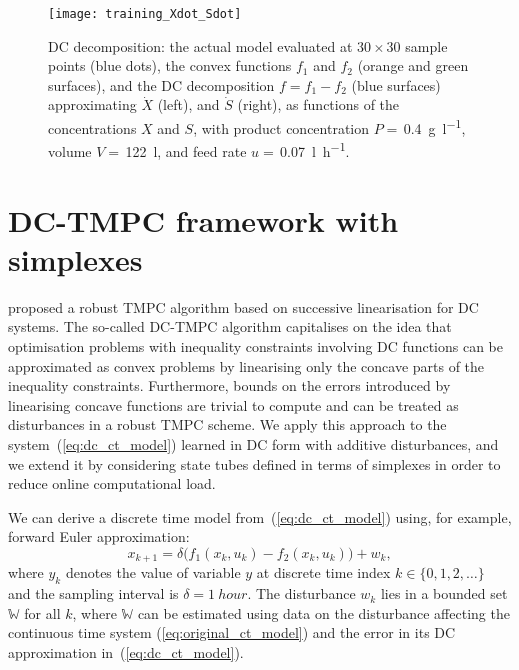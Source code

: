 \documentclass[final,5p,times,twocolumn,authoryear]{elsarticle}
\def\W{\mathbb{W}}
\begin{document}
\begin{figure}[t]
\centering
\texttt{[image: training\_Xdot\_Sdot]}%
\vspace{-2mm}%
\caption{DC decomposition: the actual model evaluated at $30\times 30$ sample points (blue dots), the convex functions $f_1$ and $f_2$ (orange and green surfaces), and the DC decomposition $f=f_1-f_2$ (blue surfaces) approximating $\dot{X}$ (left), and $\dot{S}$ (right), as functions of the concentrations $X$ and $S$, with product concentration $P= $\,\SI{0.4}{\gram\per\litre}, volume $V=$\,\SI{122}{\litre}, and feed rate $u =$\,\SI{0.07}{\litre\per\hour}.
 \label{fig:training}}
\end{figure}

\section{DC-TMPC framework with simplexes}\label{sec:dc-tmpc}

\citet{doff-sotta22} proposed a robust TMPC algorithm based on successive linearisation for DC systems. The so-called DC-TMPC algorithm capitalises on the idea that optimisation problems with inequality constraints involving DC functions can be approximated as convex problems by linearising only the concave parts of the inequality constraints. Furthermore, bounds on the errors introduced by linearising concave functions are trivial to compute and can be treated as disturbances in a robust TMPC scheme. We apply this approach to the system~(\ref{eq:dc_ct_model}) learned in DC form with additive disturbances, and we extend it by considering state tubes defined in terms of simplexes in order to reduce online computational load.

We can derive a discrete time model from~(\ref{eq:dc_ct_model}) using, for example, forward Euler approximation:
\begin{equation}\label{eq:dc_dt_model}
x_{k+1} = \delta \bigl( f_1(x_k, u_k) - f_2(x_k, u_k)\bigr) + w_k ,
\end{equation}
where $y_k$ denotes the value of variable $y$ at discrete time index $k\in\{0,1,2,\ldots\}$ and the sampling interval is $\delta=\SI{1}{hour}$. 
%
The disturbance $w_k$ lies in a bounded set $\W$ for all $k$, where $\W$ can be estimated using data on the disturbance affecting
the continuous time system (\ref{eq:original_ct_model}) and the error in its DC approximation in~(\ref{eq:dc_ct_model}).
%
\end{document}
